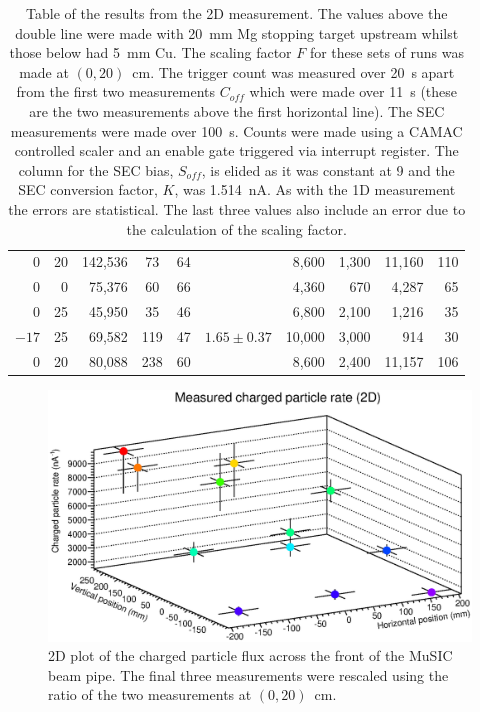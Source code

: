 \begin{table}
\begin{center}
\begin{tabular}{r | r | r | c | c | c | r@{~\(\pm\)~}r | r@{~\(\pm\)~}r}
        0      &   20      &          142,536 & 73                &   64        &          &   8,600  & 1,300  &  11,160 & 110 \\
        0      &    0      &           75,376 & 60                &   66        &          &   4,360  &   670  &   4,287 &  65 \\
      \hline \hline
         0      &   25     &           45,950 & 35                &   46        &   \multirow{3}{*}{\(1.65\pm0.37\)}
                                                                                           &   6,800  &  2,100  &  1,216 &  35 \\
       \(-17\)  &   25     &           69,582 & 119               &   47        &          &  10,000  &  3,000  &    914 &  30 \\
         0      &   20     &           80,088 & 238               &   60        &          &   8,600  &  2,400  & 11,157 & 106 \\
    \end{tabular}
  \end{center}
  \caption{Table of the results from the 2D measurement. The values above the double line were made with 20~mm Mg stopping target upstream whilst those below had 5~mm Cu. The scaling factor \(F\) for these sets of runs was made at \((0,20)\)~cm. The trigger count was measured over 20~s apart from the first two measurements \(C_{off}\) which were made over 11~s (these are the two measurements above the first horizontal line). The SEC measurements were made over 100~s. Counts were made using a CAMAC controlled scaler and an enable gate triggered via interrupt register. The column for the SEC bias, \(S_{off}\), is elided as it was constant at 9 and the SEC conversion factor, \(K\), was 1.514~nA. As with the 1D measurement the errors are statistical. The last three values also include an error due to the calculation of the scaling factor.}
  \label{tab:2d_res}
\end{table}
 
\begin{figure}[hptb]
  \centering
  \includegraphics[width=.8\textwidth]{images/plot_generating_scripts/measured_2d_charged_flux.eps}
  \caption{2D plot of the charged particle flux across the front of the MuSIC beam pipe. The final three measurements were rescaled using the ratio of the two measurements at \((0,20)\)~cm.}
  \label{fig:2D_flux}
\end{figure}
 
